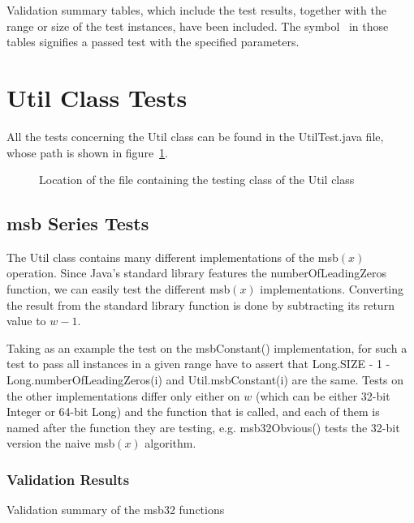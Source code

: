 Validation summary tables, which include the test results, together with the range or size of the test instances, have been included.
The symbol \checkmark \ in those tables signifies a passed test with the specified parameters.

\section{{\ttfamily Util} Class Tests}

All the tests concerning the {\ttfamily Util} class can be found in the {\ttfamily UtilTest.java} file, whose path is shown in figure~\ref{fig:utilTestTree}.

\begin{figure}[H]
    \caption{Location of the file containing the testing class of the {\ttfamily Util} class}
    \label{fig:utilTestTree}
\end{figure}

\subsection{msb Series Tests}

The {\ttfamily Util} class contains many different implementations of the msb$(x)$ operation. Since Java's standard library features the {\ttfamily numberOfLeadingZeros} function, we can easily test the different msb$(x)$ implementations. Converting the result from the standard library function is done by subtracting its return value to $w - 1$.

Taking as an example the test on the {\ttfamily msbConstant()} implementation, for such a test to pass all instances in a given range have to assert that {\ttfamily Long.SIZE - 1 - Long.numberOfLeadingZeros(i)} and {\ttfamily Util.msbConstant(i)} are the same. Tests on the other implementations differ only either on $w$ (which can be either 32-bit {\ttfamily Integer} or 64-bit {\ttfamily Long}) and the function that is called, and each of them is named after the function they are testing, e.g. {\ttfamily msb32Obvious()} tests the 32-bit version the naive msb$(x)$ algorithm.

\subsubsection{Validation Results}

\begin{table}[H]
\centering

\caption{Validation summary of the {\ttfamily msb32} functions}
\label{tab:msb32Validation}
\end{table}

